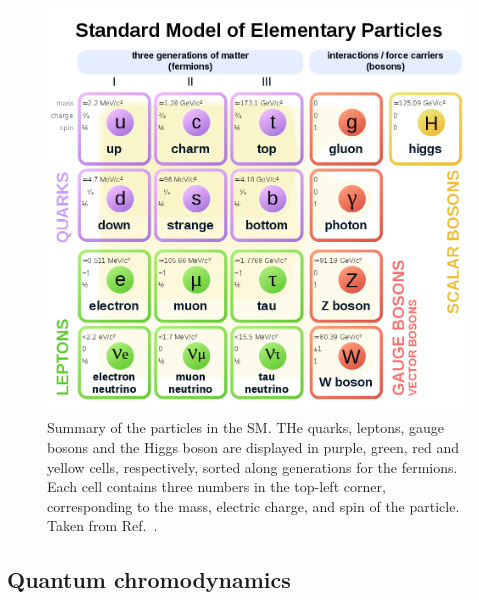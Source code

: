 \begin{figure}[hbtp]
  \begin{center}
    \includegraphics[width=0.7\linewidth]{img/theory/particles.png}
    \caption{
        Summary of the particles in the SM.
        THe quarks, leptons, gauge bosons and the Higgs boson are displayed in purple, green, red and yellow cells, respectively, sorted along generations for the fermions.
        Each cell contains three numbers in the top-left corner, corresponding to the mass, electric charge, and spin of the particle.
        Taken from Ref.~\cite{particles-wikicommons}.
        }
    \label{fig:particles}
  \end{center}
\end{figure}




\subsection{Quantum chromodynamics}

